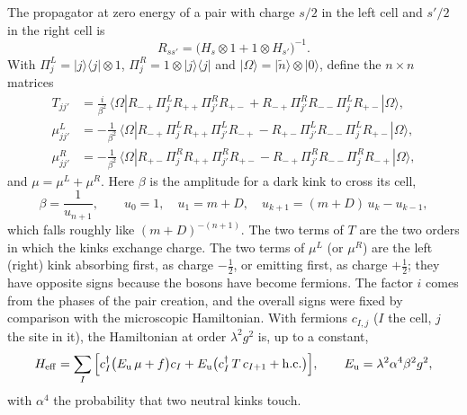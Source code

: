 \documentclass[11pt]{article}
\newcommand{\ket}[1]{|#1\rangle}
\newcommand{\bra}[1]{\langle #1|}
\newcommand{\Eu}{E_{\rm u}}
\newcommand{\hc}{\mathrm{h.c.}}
\begin{document}
The propagator at zero energy of a pair with charge $s/2$ in the left cell and $s'/2$ in the right cell is
\begin{equation}
R_{ss'}=\big(H_s\otimes1+1\otimes H_{s'}\big)^{-1}.
\label{eq:R}
\end{equation}
With $\Pi^L_j=\ket j\bra j\otimes1$, $\Pi^R_j=1\otimes\ket j\bra j$ and $\ket\Omega=\ket{\tilde n}\otimes\ket0$, define the $n\times n$ matrices
\begin{align}
T_{jj'}&=\frac{i}{\beta^2}\,\bra\Omega R_{-+}\Pi^L_jR_{++}\Pi^R_{j'}R_{+-}+R_{-+}\Pi^R_{j'}R_{--}\Pi^L_jR_{+-}\ket\Omega,\label{eq:T}\\
\mu^L_{jj'}&=-\frac{1}{\beta^2}\,\bra\Omega R_{-+}\Pi^L_jR_{++}\Pi^L_{j'}R_{-+}-R_{+-}\Pi^L_{j'}R_{--}\Pi^L_jR_{+-}\ket\Omega,\label{eq:muL}\\
\mu^R_{jj'}&=-\frac{1}{\beta^2}\,\bra\Omega R_{+-}\Pi^R_jR_{++}\Pi^R_{j'}R_{+-}-R_{-+}\Pi^R_{j'}R_{--}\Pi^R_jR_{-+}\ket\Omega,\label{eq:muR}
\end{align}
and $\mu=\mu^L+\mu^R$. Here $\beta$ is the amplitude for a dark kink to cross its cell,
\begin{equation}
\beta=\frac{1}{u_{n+1}},\qquad u_0=1,\quad u_1=m+D,\quad u_{k+1}=(m+D)\,u_k-u_{k-1},
\label{eq:beta}
\end{equation}
which falls roughly like $(m+D)^{-(n+1)}$. The two terms of $T$ are the two orders in which the kinks exchange charge. The two terms of $\mu^{L}$ (or $\mu^R$) are the left (right) kink absorbing first, as charge $-\tfrac12$, or emitting first, as charge $+\tfrac12$; they have opposite signs because the bosons have become fermions. The factor $i$ comes from the phases of the pair creation, and the overall signs were fixed by comparison with the microscopic Hamiltonian. With fermions $c_{I,j}$ ($I$ the cell, $j$ the site in it), the Hamiltonian at order $\lambda^2g^2$ is, up to a constant,
\begin{equation}
H_{\rm eff}=\sum_I\Big[c_I^\dagger\big(\Eu\,\mu+f\big)c_I+\Eu\big(c_I^\dagger\,T\,c_{I+1}+\hc\big)\Big],\qquad \Eu=\lambda^2\alpha^4\beta^2g^2 ,
\label{eq:Heff}
\end{equation}
with $\alpha^4$ the probability that two neutral kinks touch.
\end{document}
